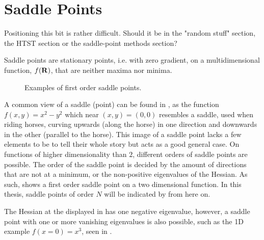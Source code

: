\section{Saddle Points }
\label{sec:sps}

\bit
\item Positioning this bit is rather difficult. Should it be in the "random stuff" section, the HTST section or the saddle-point methods section?
\item {}
\eit

Saddle points are stationary points, i.e. with zero gradient, on a multidimensional function, $f({\mathrm{\mathbf{\bm{R}}}})$, that are neither maxima nor minima.

\begin{figure}[h]
  \begin{center}
    \parbox{0.85\linewidth}{
      \caption{Examples of first order saddle points.
      }
      \label{fig:saddle-points}
    }
  \end{center}
\end{figure}

A common view of a saddle (point) can be found in , as the function $f(x, y) = x^2 - y^2$ which near $(x,y) = (0,0)$ resembles a saddle, used when riding horses, curving upwards (along the horse) in one direction and downwards in the other (parallel to the horse).
This image of a saddle point lacks a few elements to be to tell their whole story but acts as a good general case.
On functions of higher dimensionality than $2$, different orders of saddle points are possible.
The order of the saddle point is decided by the amount of directions that are not at a minimum, or the non-positive eigenvalues of the Hessian.
As such,  shows a first order saddle point on a two dimensional function.
In this thesis, saddle points of order $N$ will be indicated by  from here on.

The Hessian at the \sap{} displayed in  has one negative eigenvalue, however, a saddle point with one or more vanishing eigenvalues is also possible, such as the 1D example $f(x = 0) = x^3$, seen in .

